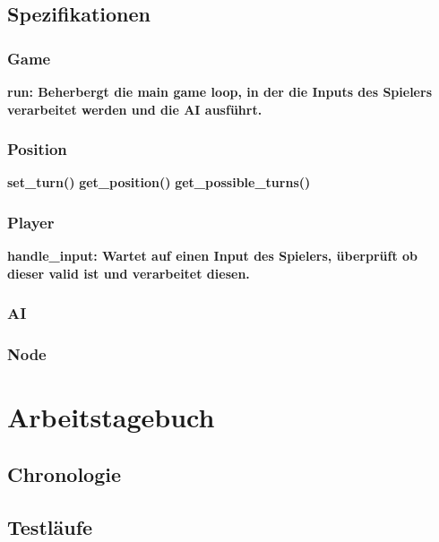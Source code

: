 \documentclass{article}
\begin{document}
\newpage

\subsection{Spezifikationen}

\subsubsection{Game}

\textbf{run: Beherbergt die main game loop, in der die Inputs des Spielers verarbeitet werden und die AI ausführt.}

\subsubsection{Position}

\textbf{set_turn()}
\textbf{get_position()}
\textbf{get_possible_turns()}

\subsubsection{Player}

\textbf{handle_input: Wartet auf einen Input des Spielers, überprüft ob dieser valid ist und verarbeitet diesen.}

\subsubsection{AI}
\subsubsection{Node}


\newpage
\section{Arbeitstagebuch}\label{section-diary}

\subsection{Chronologie}
\subsection{Testläufe}


\end{document}
